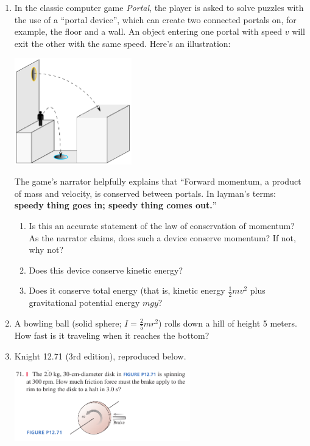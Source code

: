 \documentclass[12pt]{article}
\begin{document}
\Large
\centerline{}
\normalsize
\centerline{}

\begin{enumerate}

\item{In the classic computer game {\it Portal}, the player is asked to solve 
puzzles with the use of a ``portal device'', which can create two connected portals
on, for example, the floor and a wall. An object entering one portal with speed $v$
will exit the other with the same speed. Here's an illustration:

\includegraphics[width=0.4\textwidth]{Portal_physics-2.png}

The game's narrator helpfully explains that ``Forward momentum, a product of mass
and velocity, is conserved between portals. In layman's terms: {\bf speedy thing 
goes in; speedy thing comes out.}''
}
\begin{enumerate}
\item{Is this an accurate statement of the law of conservation of momentum? As the
narrator claims, does such a device conserve momentum? If not, why not?}
\item{Does this device conserve kinetic energy?}
\item{Does it conserve total energy (that is, kinetic energy $\frac{1}{2}mv^2$ 
plus gravitational potential energy $mgy$?}
\end{enumerate}

\item{A bowling ball (solid sphere; $I=\frac{2}{5}mr^2$) rolls down a hill
of height 5 meters. How fast is it traveling when it reaches the bottom?}

  \item{Knight 12.71 (3rd edition), reproduced below.}
  
    \includegraphics[width=0.6\textwidth]{brake.png}


\end{enumerate}
\end{document}
